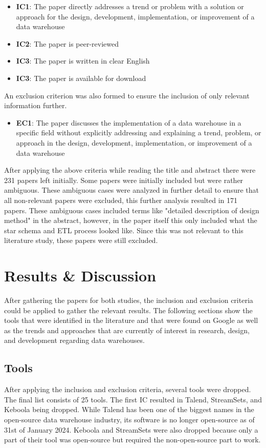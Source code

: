 \documentclass[11pt]{article}
\begin{document}
\begin{itemize}
    \item \textbf{IC1}: The paper directly addresses a trend or problem with a solution or approach for the design, development, implementation, or improvement of a data warehouse
    \item \textbf{IC2}: The paper is peer-reviewed
    \item \textbf{IC3}: The paper is written in clear English
    \item \textbf{IC3}: The paper is available for download
\end{itemize}

An exclusion criterion was also formed to ensure the inclusion of only relevant information further.
\begin{itemize}
    \item \textbf{EC1}: The paper discusses the implementation of a data warehouse in a specific field without explicitly addressing and explaining a trend, problem, or approach in the design, development, implementation, or improvement of a data warehouse
\end{itemize}

After applying the above criteria while reading the title and abstract there were 231 papers left initially. Some papers were initially included but were rather ambiguous. These ambiguous cases were analyzed in further detail to ensure that all non-relevant papers were excluded, this further analysis resulted in 171 papers. These ambiguous cases included terms like "detailed description of design method" in the abstract, however, in the paper itself this only included what the star schema and ETL process looked like. Since this was not relevant to this literature study, these papers were still excluded.\\

\section{Results \& Discussion}
\label{results}
After gathering the papers for both studies, the inclusion and exclusion criteria could be applied to gather the relevant results. The following sections show the tools that were identified in the literature and that were found on Google as well as the trends and approaches that are currently of interest in research, design, and development regarding data warehouses. \\

\subsection{Tools}
\label{results:tools}
After applying the inclusion and exclusion criteria, several tools were dropped. The final list consists of 25 tools. The first IC resulted in Talend, StreamSets, and Keboola being dropped. While Talend has been one of the biggest names in the open-source data warehouse industry, its software is no longer open-source as of 31st of January 2024. Keboola and StreamSets were also dropped because only a part of their tool was open-source but required the non-open-source part to work. \\
\end{document}
